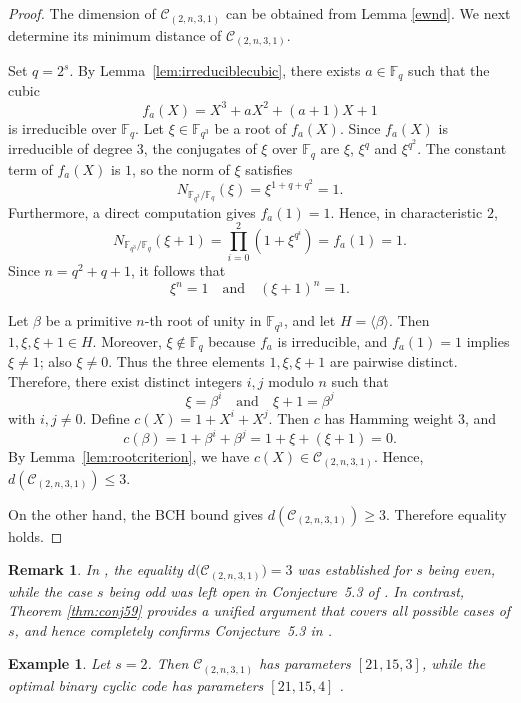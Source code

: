 \documentclass[12pt,draftcls,journal,onecolumn]{IEEEtran}
\newtheorem{remark}[theorem]{Remark}
\newtheorem{example}[theorem]{Example}
\begin{document}
\begin{proof}
The dimension of $\mathcal{C}_{(2,n,3,1)}$ can be obtained from Lemma \ref{ewnd}. We next determine its minimum distance of $\mathcal{C}_{(2,n,3,1)}$.

Set \(q=2^s\). By Lemma~\ref{lem:irreduciblecubic}, there exists \(a\in\mathbb F_q\) such that the cubic
\[
f_a(X)=X^3+aX^2+(a+1)X+1
\]
is irreducible over \(\mathbb F_q\). Let \(\xi\in\mathbb F_{q^3}\) be a root of \(f_a(X)\). Since \(f_a(X)\) is irreducible of degree \(3\), the conjugates of \(\xi\) over \(\mathbb F_q\) are
$\xi$, $\xi^q$ and $\xi^{q^2}.$
The constant term of \(f_a(X)\) is \(1\), so the norm of \(\xi\) satisfies
\[
N_{\mathbb F_{q^3}/\mathbb F_q}(\xi)
=
\xi^{1+q+q^2}
=
1.
\]
Furthermore, a direct computation gives \(f_a(1)=1\). Hence, in characteristic \(2\),
\[
N_{\mathbb F_{q^3}/\mathbb F_q}(\xi+1)
=
\prod_{i=0}^{2}(1+\xi^{q^i})
=
f_a(1)
=
1.
\]
Since \(n=q^2+q+1\), it follows that
\[
\xi^n=1
\quad\text{and}\quad
(\xi+1)^n=1.
\]

Let \(\beta\) be a primitive \(n\)-th root of unity in \(\mathbb F_{q^3}\), and let \(H=\langle \beta\rangle\). Then \(1,\xi,\xi+1\in H\). Moreover, \(\xi\notin\mathbb F_q\) because \(f_a\) is irreducible, and \(f_a(1)=1\) implies \(\xi\neq1\); also \(\xi\neq0\). Thus the three elements \(1,\xi,\xi+1\) are pairwise distinct. Therefore, there exist distinct integers \(i,j\) modulo \(n\) such that
\[
\xi=\beta^i
\quad\text{and}\quad
\xi+1=\beta^j
\]
with \(i,j\neq0\).
Define
$
c(X)=1+X^i+X^j.
$
Then \(c\) has Hamming weight \(3\), and
\[
c(\beta)=1+\beta^i+\beta^j
=
1+\xi+(\xi+1)
=
0.
\]
By Lemma~\ref{lem:rootcriterion}, we have
$
c(X)\in \mathcal C_{(2,n,3,1)}.
$
Hence,
$
d(\mathcal C_{(2,n,3,1)})\le 3.
$

On the other hand, the BCH bound gives
$
d(\mathcal C_{(2,n,3,1)})\ge 3.
$
Therefore equality holds.
\end{proof}

\begin{remark}
In \cite{Chen59}, the equality
$
d\bigl(\mathcal{C}_{(2,n,3,1)}\bigr)=3
$
was established for $s$ being even, while the case $s$ being odd  was left open in Conjecture~5.3 of \cite{Chen59}. In contrast, Theorem \ref{thm:conj59} provides a unified argument that covers all possible cases of $s$, and hence completely confirms Conjecture~5.3 in \cite{Chen59}.
\end{remark}

\begin{example}
Let \( s = 2 \). Then \(\mathcal{ C}_{(2,n,3,1)} \) has parameters \([21,15,3]\), while the optimal binary cyclic code has parameters \([21,15,4]\) \cite[Appendix A]{DingP1}.
\end{example}
\end{document}
